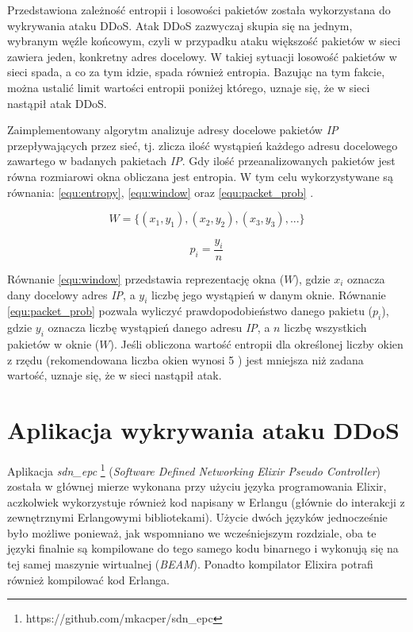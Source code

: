 Przedstawiona zależność entropii i losowości pakietów została wykorzystana do
wykrywania ataku DDoS. Atak DDoS zazwyczaj skupia się na jednym, wybranym węźle
końcowym, czyli w przypadku ataku większość pakietów w sieci zawiera jeden,
konkretny adres docelowy. W takiej sytuacji losowość pakietów w sieci spada, a
co za tym idzie, spada również entropia. Bazując na tym fakcie, można ustalić
limit wartości entropii poniżej którego, uznaje się, że w sieci nastąpił atak
DDoS. 

Zaimplementowany algorytm analizuje adresy docelowe pakietów \textit{IP}
przepływających przez sieć, tj. zlicza ilość wystąpień każdego adresu docelowego
zawartego w badanych pakietach \textit{IP}. Gdy ilość przeanalizowanych pakietów
jest równa rozmiarowi okna obliczana jest entropia. W tym celu wykorzystywane są
równania: \ref{equ:entropy}, \ref{equ:window} \cite{mainddosarticle} oraz
\ref{equ:packet_prob} \cite{mainddosarticle}.

\begin{equation}
W = \{(x_{1},y_{1}),(x_{2},y_{2}),(x_{3},y_{3}),...\}
\label{equ:window}
\end{equation}

\begin{equation}
p_{i} = \frac{y_{i}}{n}
\label{equ:packet_prob}
\end{equation}

Równanie \ref{equ:window} przedstawia reprezentację okna ($W$), gdzie $x_{i}$
oznacza dany docelowy adres \textit{IP}, a $y_{i}$ liczbę jego wystąpień w danym
oknie. Równanie \ref{equ:packet_prob} pozwala wyliczyć prawdopodobieństwo
danego pakietu ($p_{i}$), gdzie $y_{i}$ oznacza liczbę wystąpień danego adresu
\textit{IP}, a $n$ liczbę wszystkich pakietów w oknie ($W$).
Jeśli obliczona wartość entropii dla określonej liczby okien z rzędu
(rekomendowana liczba okien  wynosi 5 \cite{mainddosarticle}) jest mniejsza niż
zadana wartość, uznaje się, że w sieci nastąpił atak. 

\section{Aplikacja wykrywania ataku DDoS}

Aplikacja \textit{sdn\_epc} \footnote{https://github.com/mkacper/sdn\_epc}
(\textit{Software Defined Networking Elixir Pseudo Controller}) została w
głównej mierze wykonana przy użyciu języka programowania Elixir, aczkolwiek
wykorzystuje również kod napisany w Erlangu (głównie do interakcji z
zewnętrznymi Erlangowymi bibliotekami). Użycie dwóch języków jednocześnie było
możliwe ponieważ, jak wspomniano we wcześniejszym rozdziale, oba te języki
finalnie są kompilowane do tego samego kodu binarnego i wykonują się na tej
samej maszynie wirtualnej (\textit{BEAM}). Ponadto kompilator Elixira potrafi
również kompilować kod Erlanga.

